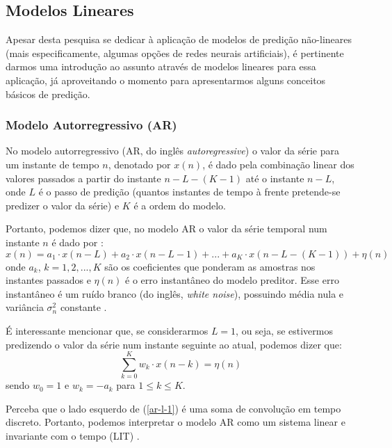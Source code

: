 \documentclass[a4paper, 12pt]{article}
\begin{document}
\subsection{Modelos Lineares}

Apesar desta pesquisa se dedicar à aplicação de modelos de predição não-lineares (mais especificamente, algumas opções de redes neurais artificiais), é pertinente darmos uma introdução ao assunto através de modelos lineares para essa aplicação, já aproveitando o momento para apresentarmos alguns conceitos básicos de predição.

\subsubsection{Modelo Autorregressivo (AR)}

No modelo autorregressivo (AR, do inglês \textit{autoregressive}) o valor da série para um instante de tempo $n$, denotado por $x(n)$, é dado pela combinação linear dos valores passados a partir do instante $n - L - (K - 1)$ até o instante $n - L$, onde $L$ é o passo de predição (quantos instantes de tempo à frente pretende-se predizer o valor da série) e $K$ é a ordem do modelo. 

Portanto, podemos dizer que, no modelo AR o valor da série temporal num instante $n$ é dado por \cite{haykin2008adaptive}:
\begin{equation}
x(n) = a_{1} \cdot x(n - L) + a_{2} \cdot x(n - L - 1) + ... + a_{K} \cdot x(n - L - (K - 1)) + \eta (n)
\end{equation}
onde $a_{k}$, $k = 1, 2, ..., K$ são os coeficientes que ponderam as amostras nos instantes passados e $\eta (n)$ é o erro instantâneo do modelo preditor. Esse erro instantâneo é um ruído branco (do inglês, \textit{white noise}), possuindo média nula e variância $\sigma_{n}^2$ constante \cite{box2015time}.

É interessante mencionar que, se considerarmos $L = 1$, ou seja, se estivermos predizendo o valor da série num instante seguinte ao atual, podemos dizer que:
\begin{equation}\label{ar-l-1}
\sum_{k=0}^{K} w_{k} \cdot x(n - k) = \eta (n)
\end{equation}
sendo $w_{0} = 1$ e $w_{k} = -a_{k}$ para $1 \leq k \leq K$.

Perceba que o lado esquerdo de (\ref{ar-l-1}) é uma soma de convolução em tempo  discreto. Portanto, podemos interpretar o modelo AR como um sistema linear e invariante com o tempo (LIT) \cite{haykin2008adaptive}.
\end{document}
